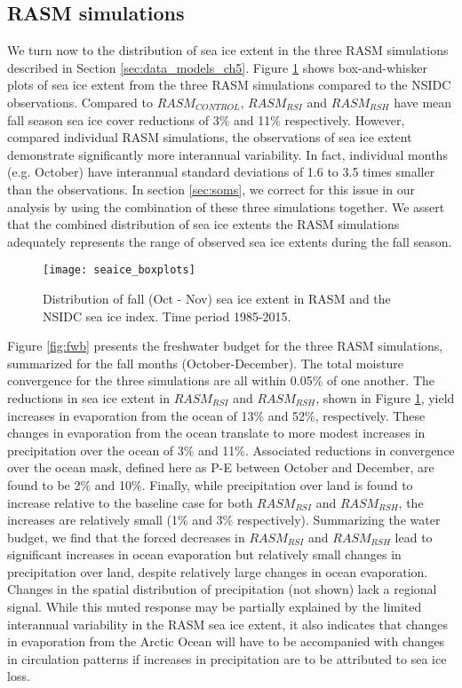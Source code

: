 \subsection{RASM simulations}
We turn now to the distribution of sea ice extent in the three RASM simulations described in Section \ref{sec:data_models_ch5}.
Figure \ref{fig:sea_ice_box} shows box-and-whisker plots of sea ice extent from the three RASM simulations compared to the NSIDC observations.
Compared to $RASM_{CONTROL}$, $RASM_{RSI}$ and $RASM_{RSH}$ have mean fall season sea ice cover reductions of 3\% and 11\% respectively.
However, compared individual RASM simulations, the observations of sea ice extent demonstrate significantly more interannual variability.
In fact, individual months (e.g. October) have interannual standard deviations of 1.6 to 3.5 times smaller than the observations.
In section \ref{sec:soms}, we correct for this issue in our analysis by using the combination of these three simulations together.
We assert that the combined distribution of sea ice extents the RASM simulations adequately represents the range of observed sea ice extents during the fall season.

\begin{figure}
  \centering
  \texttt{[image: seaice\_boxplots]}
  \caption{Distribution of fall (Oct - Nov) sea ice extent in RASM and the NSIDC sea ice index. Time period 1985-2015.}
  \label{fig:sea_ice_box}
\end{figure}

Figure \ref{fig:fwb} presents the freshwater budget for the three RASM simulations, summarized for the fall months (October-December).
The total moisture convergence for the three simulations are all within 0.05\% of one another.
The reductions in sea ice extent in $RASM_{RSI}$ and $RASM_{RSH}$, shown in Figure \ref{fig:sea_ice_box}, yield increases in evaporation from the ocean of 13\% and 52\%, respectively.
These changes in evaporation from the ocean translate to more modest increases in precipitation over the ocean of 3\% and 11\%.
Associated reductions in convergence over the ocean mask, defined here as P-E between October and December, are found to be 2\% and 10\%.
Finally, while precipitation over land is found to increase relative to the baseline case for both $RASM_{RSI}$ and $RASM_{RSH}$, the increases are relatively small (1\% and 3\% respectively).
Summarizing the water budget, we find that the forced decreases in $RASM_{RSI}$ and $RASM_{RSH}$ lead to significant increases in ocean evaporation but relatively small changes in precipitation over land, despite relatively large changes in ocean evaporation.
Changes in the spatial distribution of precipitation (not shown) lack a regional signal.
While this muted response may be partially explained by the limited interannual variability in the RASM sea ice extent, it also indicates that changes in evaporation from the Arctic Ocean will have to be accompanied with changes in circulation patterns if increases in precipitation are to be attributed to sea ice loss.

